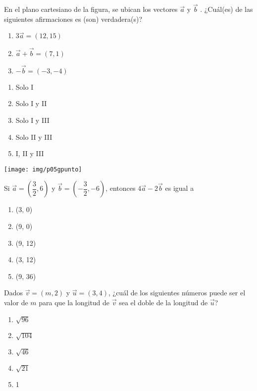 \begin{enumerate}[label=\large{\textbf{\arabic*.}}, itemsep = 0.15cm, topsep = 0.5cm]
	
	\parbox{1\linewidth}{\item En el plano cartesiano de la figura, se ubican los vectores $\vec{a}$ y $\vec{b}$ . ¿Cuál(es) de las siguientes afirmaciones es (son) verdadera(s)?	
		\begin{enumerate}[label={\Roman*)}, itemsep = 0.5cm, topsep = 0.5cm, leftmargin = 2.4cm]
			\item $3\vec{a}=(12,15)$
			\item $\vec{a}+\vec{b}=(7,1)$
			\item $-\vec{b}=(-3,-4)$
		\end{enumerate}
		\begin{minipage}[t][3cm][t]{0.5\linewidth}
			\begin{enumerate}[label={\Alph*)}, itemsep = 0.15cm, topsep = 0.3cm]
				\item Solo I
				\item Solo I y II
				\item Solo I y III
				\item Solo II y III
				\item I, II y III
			\end{enumerate}
		\end{minipage}
		\begin{minipage}[t][1cm][t]{0.49\linewidth}
			\vspace{-2cm} %
			\hspace{-1cm} %
			\texttt{[image: img/p05gpunto]} %
	\end{minipage}}
	
	
	\parbox{1\linewidth}{ \item Si $\vec{a}=\left(\dfrac{3}{2}, 6\right)$ y $\vec{b}=\left(-\dfrac{3}{2},-6\right)$, entonces $4\vec{a}-2\vec{b}$ es igual a 
		\begin{enumerate}[label={\Alph*)}, itemsep = 0.15cm, topsep = 0.5cm]
			\item (3, 0)
			\item (9, 0)
			\item (9, 12)
			\item (3, 12)
			\item (9, 36)
	\end{enumerate}}
	
	
	\parbox{1\linewidth}{ \item Dados $\vec{v} = (m, 2)$ y $\vec{u} = (3, 4)$, ¿cuál de los siguientes números puede ser el valor de $m$ para que la longitud de $\vec{v}$ sea el doble de la longitud de $\vec{u}$? 
		\begin{enumerate}[label={\Alph*)}, itemsep = 0.15cm, topsep = 0.5cm]
			\item $\sqrt{96}$
			\item $\sqrt{104}$
			\item $\sqrt{46}$
			\item $\sqrt{21}$
			\item 1
	\end{enumerate}}
	

\end{enumerate}
